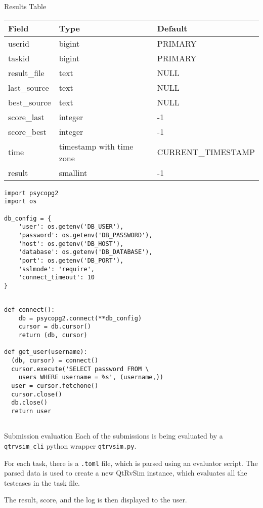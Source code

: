 \documentclass{beamer}
\begin{document}
		\begin{frame}{Results Table}
			\small
			\begin{tabular}{|l|l|l|}
			\hline
			Field & Type & Default \\
			\hline
			userid & bigint & PRIMARY \\
			taskid & bigint & PRIMARY \\
			result\_file & text & NULL \\
			last\_source & text & NULL \\
			best\_source & text & NULL \\
			score\_last & integer & -1 \\
			score\_best & integer & -1 \\
			time & timestamp with time zone & CURRENT\_TIMESTAMP \\
			result & smallint & -1 \\
			\hline
			\end{tabular}
		\end{frame}

		\begin{frame}[fragile]
			\begin{verbatim}
import psycopg2
import os

db_config = {
	'user': os.getenv('DB_USER'),
	'password': os.getenv('DB_PASSWORD'),
	'host': os.getenv('DB_HOST'),
	'database': os.getenv('DB_DATABASE'),
	'port': os.getenv('DB_PORT'),
	'sslmode': 'require',
	'connect_timeout': 10
}
			\end{verbatim}
		\end{frame}

		\begin{frame}[fragile]
			\begin{verbatim}

def connect():
	db = psycopg2.connect(**db_config)
	cursor = db.cursor()
	return (db, cursor)

def get_user(username):
  (db, cursor) = connect()
  cursor.execute('SELECT password FROM \
	users WHERE username = %s', (username,))
  user = cursor.fetchone()
  cursor.close()
  db.close()
  return user
	
			\end{verbatim}
		\end{frame}

		\begin{frame}{Submission evaluation}
			Each of the submissions is being evaluated by a \texttt{qtrvsim\_cli} python wrapper \texttt{qtrvsim.py}. \par
	
			For each task, there is a \texttt{.toml} file, which is parsed using an evaluator script. The parsed data is used to create a new QtRvSim instance, which evaluates all the testcases in the task file. \par
	
			The result, score, and the log is then displayed to the user.
		\end{frame}
	
\end{document}
